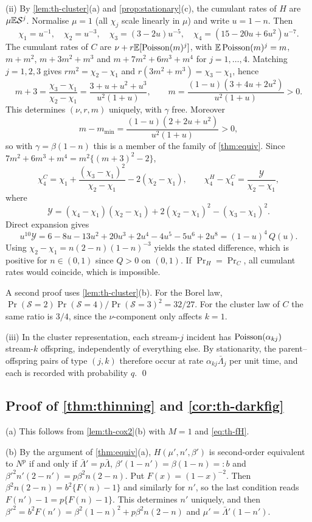 (ii) By \cref{lem:th-cluster}(a) and \cref{prop:stationary}(c), the cumulant rates of $H$
are $\mu\mathbb{E} \mathcal S^j$. Normalise $\mu=1$ (all $\chi_j$ scale linearly in $\mu$) and write
$u=1-n$. Then
\[
\chi_1=u^{-1},\quad \chi_2=u^{-3},\quad \chi_3=(3-2u)u^{-5},\quad
\chi_4=(15-20u+6u^2)u^{-7}.
\]
The cumulant rates of $C$ are $\nu+r\mathbb{E}[\operatorname{Poisson}(m)^j]$, with
$\mathbb{E}\operatorname{Poisson}(m)^j=m$, $m+m^2$, $m+3m^2+m^3$ and $m+7m^2+6m^3+m^4$ for $j=1,\dots,4$.
Matching $j=1,2,3$ gives $r m^2=\chi_2-\chi_1$ and
$r(3m^2+m^3)=\chi_3-\chi_1$, hence
\[
m+3=\frac{\chi_3-\chi_1}{\chi_2-\chi_1}
=\frac{3+u+u^2+u^3}{u^2(1+u)},\qquad
m=\frac{(1-u)(3+4u+2u^2)}{u^2(1+u)}>0 .
\]
This determines $(\nu,r,m)$ uniquely, with $\gamma$ free. Moreover
\[
m-m_{\min}=\frac{(1-u)(2+2u+u^2)}{u^2(1+u)}>0 ,
\]
so with $\gamma=\beta(1-n)$ this is a member of the family of \cref{thm:equiv}. Since
$7m^2+6m^3+m^4=m^2\{(m+3)^2-2\}$,
\[
\chi_4^C=\chi_1+\frac{(\chi_3-\chi_1)^2}{\chi_2-\chi_1}-2(\chi_2-\chi_1),
\qquad
\chi_4^H-\chi_4^C=\frac{\mathcal Y}{\chi_2-\chi_1},
\]
where
\[
\mathcal Y=(\chi_4-\chi_1)(\chi_2-\chi_1)+2(\chi_2-\chi_1)^2-(\chi_3-\chi_1)^2 .
\]
Direct expansion gives
\[
u^{10}\mathcal Y=6-8u-13u^2+20u^3+2u^4-4u^5-5u^6+2u^8=(1-u)^4\,Q(u).
\]
Using $\chi_2-\chi_1=n(2-n)(1-n)^{-3}$ yields the stated difference, which is
positive for $n\in(0,1)$ since $Q>0$ on $(0,1)$. If $\Pr_H=\Pr_C$, all cumulant rates
would coincide, which is impossible.

A second proof uses \cref{lem:th-cluster}(b). For the Borel law,
$\Pr(\mathcal S=2)\Pr(\mathcal S=4)/\Pr(\mathcal S=3)^2=32/27$. For the cluster law of $C$ the same ratio is $3/4$,
since the $\nu$-component only affects $k=1$.

(iii) In the cluster representation, each stream-$j$ incident has $\operatorname{Poisson}(\alpha_{kj})$
stream-$k$ offspring, independently of everything else. By stationarity, the
parent--offspring pairs of type $(j,k)$ therefore occur at rate $\alpha_{kj}\bar\Lambda_j$
per unit time, and each is recorded with probability $q$. \qed

\subsection{Proof of \texorpdfstring{\cref{thm:thinning}}{Theorem (thinning)} and \texorpdfstring{\cref{cor:th-darkfig}}{Corollary (dark-figure correction)}}

(a) This follows from \cref{lem:th-cox2}(b) with $M=1$ and \eqref{eq:th-fH}.

(b) By the argument of \cref{thm:equiv}(a), $H(\mu',n',\beta')$ is second-order
equivalent to $N^p$ if and only if $\bar\Lambda'=p\bar\Lambda$,
$\beta'(1-n')=\beta(1-n)=:b$ and $\beta'^2n'(2-n')=p\beta^2n(2-n)$. Put
$F(x)=(1-x)^{-2}$. Then $\beta^2n(2-n)=b^2\{F(n)-1\}$ and similarly for $n'$, so the
last condition reads $F(n')-1=p\{F(n)-1\}$. This determines $n'$ uniquely, and then
$\beta'^2=b^2F(n')=\beta^2(1-n)^2+p\beta^2n(2-n)$ and $\mu'=\bar\Lambda'(1-n')$.

